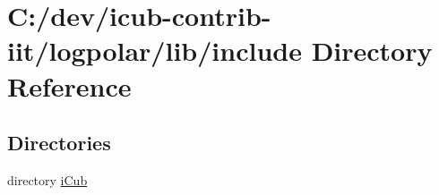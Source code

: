 \section{C\+:/dev/icub-\/contrib-\/iit/logpolar/lib/include Directory Reference}
\label{dir_5a30104352ef4255dc24354b02eb2d20}
\subsection*{Directories}
\begin{DoxyCompactItemize}
\item 
directory \hyperlink{dir_05906369c2d654c318c8e5f0b9121080}{i\+Cub}
\end{DoxyCompactItemize}
